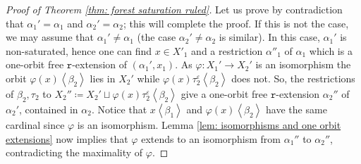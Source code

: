 \documentclass[10pt,a4paper]{amsart}
\newcommand{\la}{\left\langle}
\newcommand{\ra}{\right\rangle}
\newcommand{\trrule}{\mathtt{r}}
\begin{document}
\begin{proof}[Proof of Theorem \ref{thm: forest saturation ruled}]
		Let us prove by contradiction that $\alpha_1' = \alpha_1$ and $\alpha_2' = \alpha_2$; this will complete the proof.
		If this is  not the case, we may assume that $\alpha_1' \neq \alpha_1$ 
		(the case $\alpha_2' \neq \alpha_2$ is similar).
		In this case, $\alpha_1'$ is non-saturated,
		hence one can find \(x\in X'_1\) and a restriction \(\alpha''_1\) of \( \alpha_1 \)
		which is a one-orbit free \( \trrule \)-extension of \( (\alpha_1',x_1) \).
		As $\varphi: X_1' \to X_2'$ is an isomorphism
		the orbit $\varphi(x) \la \beta_2 \ra$ lies in $X_2'$
		while $\varphi(x) \tau_2^\varepsilon \la \beta_2 \ra$ does not.
		So, the restrictions of $\beta_2, \tau_2$ to 	
		\(X_2'' \coloneqq X_2' \sqcup \varphi(x) \tau_2^\varepsilon \la \beta_2 \ra\)
		give a one-orbit free \(\trrule\)-extension $\alpha_2''$ of $\alpha_2'$, contained in $\alpha_2$.
		Notice that $x \la \beta_1 \ra$ and $\varphi(x) \la \beta_2 \ra$
		have the same cardinal since $\varphi$ is an isomorphism.
		Lemma \ref{lem: isomorphisms and one orbit extensions} now implies
		that $\varphi$ extends to an isomorphism from $\alpha_1''$ to $\alpha_2''$, 
		contradicting the maximality of $\varphi$.
	\end{proof}
\end{document}
